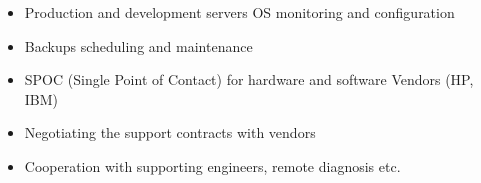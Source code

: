\documentclass[letterpaper]{tenseconds} %
\begin{document}
\begin{twenty}
{{\begin{itemize}
			\item Production and development servers OS monitoring and configuration
			\item Backups scheduling and maintenance
			\item SPOC (Single Point of Contact) for hardware and software Vendors (HP, IBM)
			\item Negotiating the support contracts with vendors
			\item Cooperation with supporting engineers, remote diagnosis etc.
			\end{itemize}}
	}
	 
	
	        
\end{twenty}
\end{document}
